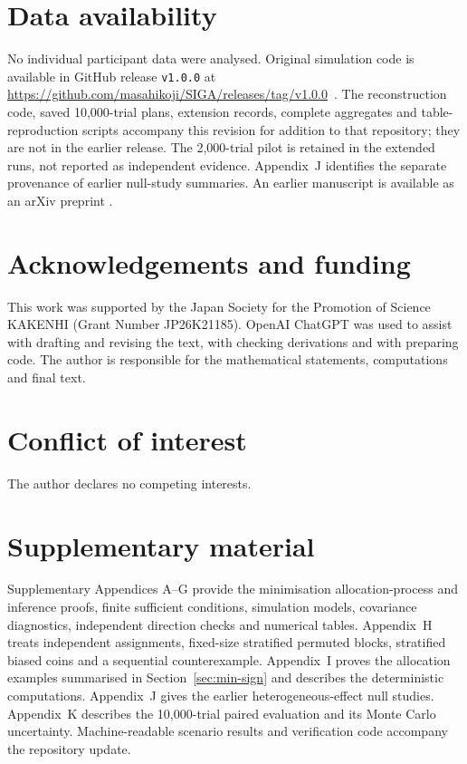 \documentclass[12pt,a4paper]{article}
\theoremstyle{definition}
\newcommand{\CodeRepository}{\url{https://github.com/masahikoji/SIGA/releases/tag/v1.0.0}}
\begin{document}
\section*{Data availability}
No individual participant data were analysed. Original simulation code is available in GitHub release \texttt{v1.0.0} at \CodeRepository\ \citep{KojimaSIGA2026}. The reconstruction code, saved 10,000-trial plans, extension records, complete aggregates and table-reproduction scripts accompany this revision for addition to that repository; they are not in the earlier release. The 2,000-trial pilot is retained in the extended runs, not reported as independent evidence. Appendix~J identifies the separate provenance of earlier null-study summaries. An earlier manuscript is available as an arXiv preprint \citep{KojimaPreprint2026}.

\section*{Acknowledgements and funding}
This work was supported by the Japan Society for the Promotion of Science KAKENHI (Grant Number JP26K21185). OpenAI ChatGPT was used to assist with drafting and revising the text, with checking derivations and with preparing code. The author is responsible for the mathematical statements, computations and final text.

\section*{Conflict of interest}
The author declares no competing interests.

\section*{Supplementary material}
Supplementary Appendices A--G provide the minimisation allocation-process and inference proofs, finite sufficient conditions, simulation models, covariance diagnostics, independent direction checks and numerical tables. Appendix~H treats independent assignments, fixed-size stratified permuted blocks, stratified biased coins and a sequential counterexample. Appendix~I proves the allocation examples summarised in Section~\ref{sec:min-sign} and describes the deterministic computations. Appendix~J gives the earlier heterogeneous-effect null studies. Appendix~K describes the 10,000-trial paired evaluation and its Monte Carlo uncertainty. Machine-readable scenario results and verification code accompany the repository update.
\end{document}
